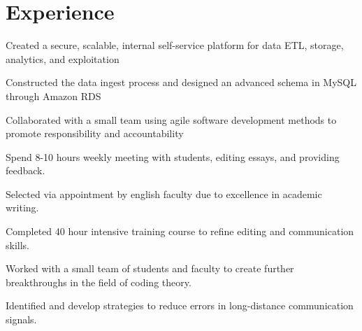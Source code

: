 \documentclass{resume}
\begin{document}
\begin{minipage}[t]{0.66\textwidth}


\section{Experience}

\vspace{1.25\topsep} %
\begin{tightemize}
\item Created a secure, scalable, internal self-service platform for data ETL, storage, analytics, and exploitation
\item Constructed the data ingest process and designed an advanced schema in MySQL through Amazon RDS
\item Collaborated with a small team using agile software development methods to promote responsibility and accountability
\end{tightemize}
\sectionsep

\begin{tightemize}
\item Spend 8-10 hours weekly meeting with students, editing essays, and providing feedback. 
\item Selected via appointment by english faculty due to excellence in academic writing.
\item Completed 40 hour intensive training course to refine editing  and communication skills.
\end{tightemize}
\sectionsep

\begin{tightemize}
\item Worked with a small team of students and faculty to create further breakthroughs in the field of coding theory.
\item Identified and develop strategies to reduce errors in long-distance communication signals.
\end{tightemize}
\sectionsep



\end{minipage}
\end{document}
